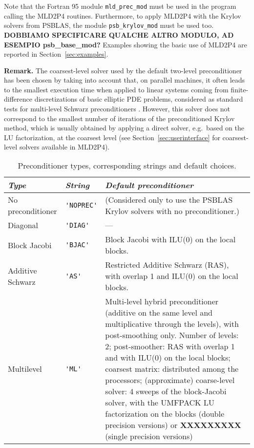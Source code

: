 Note that the Fortran 95 module \verb|mld_prec_mod| must be used in the program
calling the MLD2P4 routines. Furthermore, to apply MLD2P4 with the Krylov solvers
from PSBLAS, the module \verb|psb_krylov_mod| must be used too.
\textbf{DOBBIAMO SPECIFICARE QUALCHE ALTRO MODULO, AD ESEMPIO psb\_base\_mod?}
Examples showing the basic use of MLD2P4 are reported in Section~\ref{sec:examples}.

\noindent
\textbf{Remark.} The coarsest-level solver used by the default two-level
preconditioner has been chosen by taking into account that, on parallel
machines, it often leads to the smallest execution time when applied to
linear systems coming from finite-difference discretizations of basic
elliptic PDE problems, considered as standard tests for multi-level Schwarz
preconditioners \cite{apnum_07,aaecc_07}. However, this solver does not correspond
to the smallest number of iterations of the preconditioned Krylov method, which is
usually obtained by applying a direct solver, e.g.\ based on the LU factorization, at
the coarsest level (see Section~\ref{sec:userinterface} for coarsest-level
solvers available in MLD2P4).

\begin{table}[th]
{
\begin{center}
\begin{tabular}{|l|l|p{6.7cm}|}
\hline
\emph{Type}       & \emph{String} & \emph{Default preconditioner} \\ \hline
No preconditioner &\verb|'NOPREC'|& (Considered only to use the PSBLAS
                                    Krylov solvers with no preconditioner.) \\
Diagonal          & \verb|'DIAG'| & --- \\
Block Jacobi      & \verb|'BJAC'| & Block Jacobi with ILU(0) on the local blocks.\\ 
Additive Schwarz  & \verb|'AS'|   & Restricted Additive Schwarz (RAS),
                                    with overlap 1 and ILU(0) on the local blocks. \\ 
Multilevel        &\verb|'ML'|    & Multi-level hybrid preconditioner (additive on the
                                    same level and multiplicative through the levels),
                                    with post-smoothing only. Number of levels: 2;
                                    post-smoother: RAS with overlap 1 and with ILU(0)
                                    on the local blocks; coarsest matrix: distributed 
                                    among the processors; (approximate) coarse-level
                                    solver: 4 sweeps of the block-Jacobi solver, 
                                    with the UMFPACK LU factorization
                                    on the blocks (double precision versions) or
                                    \textbf{XXXXXXXXX} (single precision versions)\\
\hline
\end{tabular}
\end{center}
}
\caption{Preconditioner types, corresponding strings and default choices.
\label{tab:precinit}}
\end{table}

